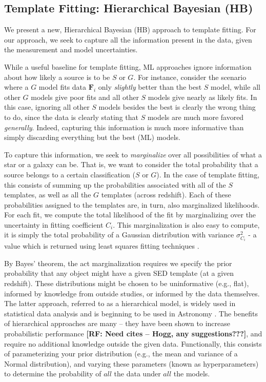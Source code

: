 \documentclass[12pt,preprint]{aastex}
\newcommand{\datavector}[1]{\boldsymbol{#1}}
\newcommand\rf[1]{{\bf [RF: #1]}}
\begin{document}
\subsection{Template Fitting: Hierarchical Bayesian (HB)}
\label{ssec:HBmethod}

We present a new, Hierarchical Bayesian (HB) approach to template fitting.  For our 
approach, we seek to capture all the information present in the data, given the 
measurement and model uncertainties.  

While a useful baseline for template 
fitting, ML approaches ignore information about how likely a source is to be 
$S$ or $G$.  For instance, consider the scenario where a $G$ model fits data 
$\datavector{F}_i$ only \textit{slightly} better than the best $S$ model, while all 
other $G$ models give poor fits and all other $S$ models give nearly as likely 
fits.  In this case, ignoring all other $S$ models besides the best is clearly the 
wrong thing to do, since the data is clearly stating that $S$ models are much 
more favored \textit{generally}.  Indeed, capturing this information is 
much more informative than simply discarding everything but the 
best (ML) models. 

To capture this information, we seek to \textit{marginalize} over all possibilities 
of what a star or a galaxy can be.  That is, we want to consider the total probability 
that a source belongs to a certain classification ($S$ or $G$).  In the case of template 
fitting, this consists of summing up the probabilities associated with all of the $S$ 
templates, as well as all the $G$ templates (across redshift).  Each of these probabilities 
assigned to the templates are, in turn, also marginalized likelihoods.  For each fit, we 
compute the total likelihood of the fit by marginalizing over the uncertainty in fitting 
coefficient $C_i$.  This marginalization is also easy to compute, it is simply the total 
probability of a Gaussian distribution with variance $\sigma_{C_i}^2$ - a value which 
is returned using least squares fitting techniques \citep[e.g.,][]{hogg10}.

By Bayes' theorem, the act marginalization requires we specify the prior probability 
that any object might have a given SED template (at a given redshift).  These 
distributions might be chosen to be uninformative (e.g., flat), informed by knowledge 
from outside studies, or informed by the data themselves.   The latter approach, 
referred to as a hierarchical model, is widely used in statistical data analysis \citep[e.g.,][]{gelman03} and is 
beginning to be used in Astronomy \citep{shu12}.  The benefits of hierarchical 
approaches are many -- they have been shown to increase probabilistic performance 
\rf{Need cites -- Hogg, any suggestions???}, and require no additional knowledge outside the given data.  Functionally, 
this consists of parameterizing your prior distribution (e.g., the mean and variance of a 
Normal distribution), and varying these parameters (known as hyperparameters) 
to determine the probability of $all$ the data under $all$ the models.  
\end{document}
